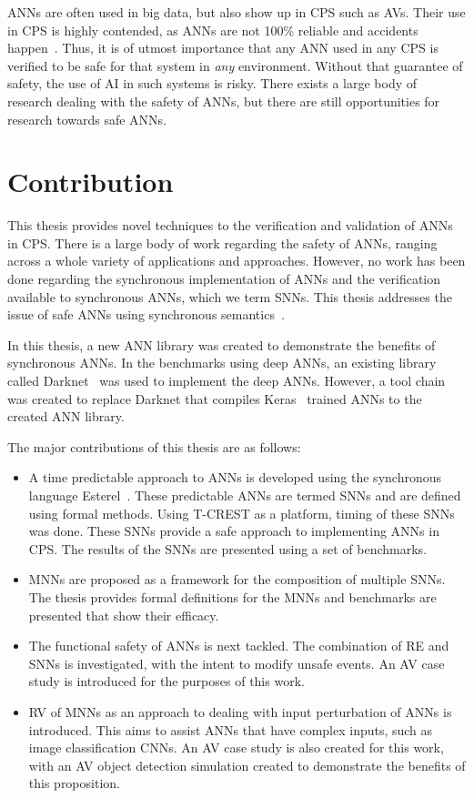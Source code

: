 \acp{ANN} are often used in big data, but also show up in \ac{CPS} such as \acfp{AV}.
Their use in \ac{CPS} is highly contended, as \acp{ANN} are not 100\% reliable and accidents happen~\cite{coldewey_2018}.
Thus, it is of utmost importance that any \ac{ANN} used in any \ac{CPS} is verified to be safe for that system in \textit{any} environment.
Without that guarantee of safety, the use of \ac{AI} in such systems is risky.
There exists a large body of research dealing with the safety of \acp{ANN}, but there are still opportunities for research towards safe \acp{ANN}.

\section{Contribution}
This thesis provides novel techniques to the verification and validation of \acfp{ANN} in \acf{CPS}.
There is a large body of work regarding the safety of \acp{ANN}, ranging across a whole variety of applications and approaches.
However, no work has been done regarding the synchronous implementation of \acp{ANN} and the verification available to synchronous \acp{ANN}, which we term \acfp{SNN}.  
This thesis addresses the issue of safe \acp{ANN} using synchronous semantics~\cite{berry1991}.

In this thesis, a new \ac{ANN} library was created to demonstrate the benefits of synchronous \acp{ANN}.
In the benchmarks using deep \acp{ANN}, an existing library called Darknet~\cite{darknet13} was used to implement the deep \acp{ANN}.
However, a tool chain was created to replace Darknet that compiles Keras~\cite{chollet2015keras} trained \acp{ANN} to the created \ac{ANN} library.

The major contributions of this thesis are as follows:
\begin{itemize}
	\item A time predictable approach to \acp{ANN} is developed using the synchronous language Esterel~\cite{berry2000foundations}. These predictable \acp{ANN} are termed \acfp{SNN} and are defined using formal methods. Using T-CREST as a platform, timing of these \acp{SNN} was done. These \acp{SNN} provide a safe approach to implementing \acp{ANN} in \ac{CPS}. The results of the \acp{SNN} are presented using a set of benchmarks. 
	\item \acfp{MNN} are proposed as a framework for the composition of multiple \acp{SNN}. The thesis provides formal definitions for the \acp{MNN} and benchmarks are presented that show their efficacy. 
	\item The functional safety of \acp{ANN} is next tackled. The combination of \acf{RE} and \acp{SNN} is investigated, with the intent to modify unsafe events. An \acf{AV} case study is introduced for the purposes of this work.
	\item \acf{RV} of \acp{MNN} as an approach to dealing with input perturbation of \acp{ANN} is introduced. This aims to assist \acp{ANN} that have complex inputs, such as image classification \acfp{CNN}. An \ac{AV} case study is also created for this work, with an \ac{AV} object detection simulation created to demonstrate the benefits of this proposition. 
\end{itemize}

